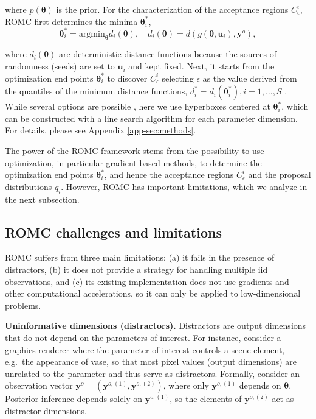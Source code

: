 \documentclass[twoside]{article}
\newcommand{\thb}{\boldsymbol{\theta}}
\newcommand{\ub}{\mathbf{u}}
\newcommand{\yb}{\mathbf{y}}
\newcommand{\data}{\mathbf{y}^o}
\newcommand{\accregioni}{C_{\epsilon}^i}
\begin{document}
where $p(\thb)$ is the prior. For the characterization of the acceptance regions $\accregioni$, ROMC first determines the minima $\thb_i^*$,
\begin{equation}
 \thb_i^* = \text{argmin}_{\thb} d_i(\thb),\quad d_i(\thb) = d(g(\thb, \ub_i), \data),       
 \label{eq:optim_end_points}
\end{equation}

where $d_i(\thb)$ are deterministic distance functions because the sources of randomness (seeds) are set to $\ub_i$ and kept fixed.
Next, it starts from the optimization end points $\thb_i^*$ to discover $\accregioni$ selecting $\epsilon$ as the value derived from the quantiles of the minimum distance functions, $d_i^*=d_i(\thb_i^*), i=1, \ldots, S$ \citep[see][for details]{ikonomov2020robust}. While several options are possible \citep{ikonomov2020robust}, here we use hyperboxes centered at $\thb_i^*$, which can be constructed with a line search algorithm for each parameter dimension. For details, please see Appendix \ref{app-sec:methods}.

The power of the ROMC framework stems from the possibility to use optimization, in particular gradient-based methods, to determine the optimization end points $\thb_i^*$, and hence the acceptance regions $\accregioni$ and the proposal distributions $q_i$. 
However, ROMC has important limitations, which we analyze in the next subsection.

\subsection{ROMC challenges and limitations}
\label{sec:romc-limitations}

ROMC suffers from three main limitations;
(a) it fails in the presence of distractors,
(b) it does not provide a strategy for handling multiple iid observations, and
(c) its existing implementation does not use gradients and other computational accelerations, so it can only be applied to low-dimensional problems.

\textbf{Uninformative dimensions (distractors).}
\label{sec:romc-limitation-1}
Distractors are output dimensions that do not depend on the parameters of interest. For instance, consider a graphics renderer where the parameter of interest controls a scene element, e.g.\ the appearance of vase, so that most pixel values (output dimensions) are unrelated to the parameter and thus serve as distractors.
Formally, consider an observation vector $\yb^o = (\yb^{o, (1)}, \yb^{o, (2)})$, 
where only $\yb^{o, (1)}$ depends on $\thb$.
Posterior inference depends solely on $\yb^{o, (1)}$, so the elements of $\yb^{o, (2)}$ act as distractor dimensions.
\end{document}
